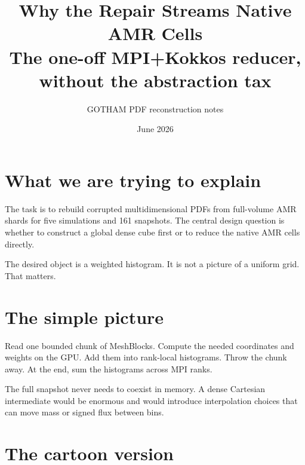 \documentclass[11pt]{article}
\title{Why the Repair Streams Native AMR Cells\\\large The one-off MPI+Kokkos reducer, without the abstraction tax}
\author{GOTHAM PDF reconstruction notes}
\date{June 2026}
\begin{document}
\maketitle
{}

\section{What we are trying to explain}

The task is to rebuild corrupted multidimensional PDFs from full-volume
 AMR shards for five simulations and 161 snapshots. The
central design question is whether to construct a global dense cube first or
to reduce the native AMR cells directly.

The desired object is a weighted histogram. It is not a picture of a uniform
grid. That matters.

\section{The simple picture}

Read one bounded chunk of MeshBlocks. Compute the needed coordinates and
weights on the GPU. Add them into rank-local histograms. Throw the chunk away.
At the end, sum the histograms across MPI ranks.

The full snapshot never needs to coexist in memory. A dense Cartesian
intermediate would be enormous and would introduce interpolation choices that
can move mass or signed flux between bins.

\section{The cartoon version}
\end{document}
